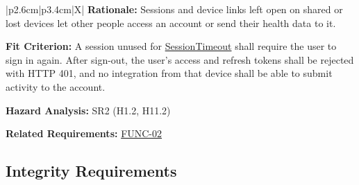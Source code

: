 \documentclass[12pt]{article}
\newcommand{\const}[1]{\hyperlink{const:#1}{\textsf{#1}}}
\begin{document}
\begin{xltabular}{\textwidth}{|p{2.6cm}|p{3.4cm}|X|}
\textbf{Rationale:} Sessions and device links left open on shared or lost devices let other people access an account or send their health data to it.

\textbf{Fit Criterion:} A session unused for \const{SessionTimeout} shall require the user to sign in again. After sign-out, the user's access and refresh tokens shall be rejected with HTTP 401, and no integration from that device shall be able to submit activity to the account.

\textbf{Hazard Analysis:} SR2 (H1.2, H11.2) 

\textbf{Related Requirements:} \hyperlink{req:FUNC-02}{FUNC-02}\\
\hline

\end{xltabular}
\subsection{Integrity Requirements}
\end{document}
